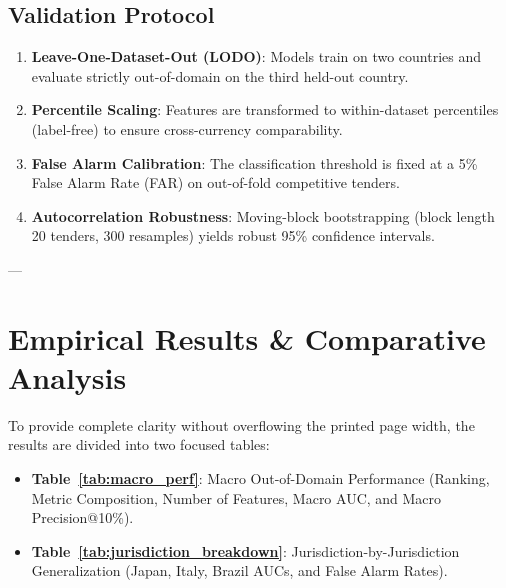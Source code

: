 \documentclass[11pt,a4paper]{article}
\renewcommand{\_}{\textunderscore\allowbreak}
\begin{document}
\subsection{Validation Protocol}
\begin{enumerate}[noitemsep]
    \item \textbf{Leave-One-Dataset-Out (LODO)}: Models train on two countries and evaluate strictly out-of-domain on the third held-out country.
    \item \textbf{Percentile Scaling}: Features are transformed to within-dataset percentiles (label-free) to ensure cross-currency comparability.
    \item \textbf{False Alarm Calibration}: The classification threshold is fixed at a 5\% False Alarm Rate (FAR) on out-of-fold competitive tenders.
    \item \textbf{Autocorrelation Robustness}: Moving-block bootstrapping (block length 20 tenders, 300 resamples) yields robust 95\% confidence intervals.
\end{enumerate}

---

\section{Empirical Results \& Comparative Analysis}

To provide complete clarity without overflowing the printed page width, the results are divided into two focused tables:
\begin{itemize}[noitemsep]
    \item \textbf{Table~\ref{tab:macro_perf}}: Macro Out-of-Domain Performance (Ranking, Metric Composition, Number of Features, Macro AUC, and Macro Precision@10\%).
    \item \textbf{Table~\ref{tab:jurisdiction_breakdown}}: Jurisdiction-by-Jurisdiction Generalization (Japan, Italy, Brazil AUCs, and False Alarm Rates).
\end{itemize}
\end{document}

